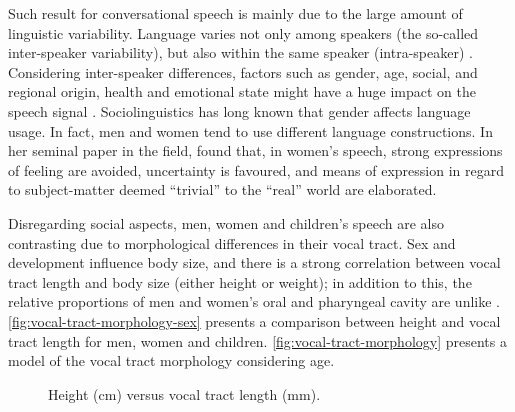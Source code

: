 Such result for conversational speech is mainly due to the large amount of linguistic variability. Language varies not only among speakers (the so-called inter-speaker variability), but also within the same speaker (intra-speaker) \citep{Benzeghiba2007}.  Considering inter-speaker differences, factors such as gender, age, social, and regional 
origin, health and emotional state might have a huge impact on the speech signal \citep{Benzeghiba2007}.
Sociolinguistics has long known that gender affects language usage. In fact, men and women tend to use different language constructions.
In her seminal paper in the field, \citet{Lakoff1973} found that, in women's speech, strong expressions 
of feeling are avoided, uncertainty is favoured, and means of expression in regard to subject-matter deemed ``trivial'' to the 
``real'' world are elaborated. 

Disregarding social aspects, men, women and children's speech are also contrasting due to morphological differences
in their vocal tract. Sex and development influence body size, and there is a strong correlation between vocal tract length and body size 
(either height or weight); in addition to this, the relative proportions of men and women's oral and pharyngeal cavity are unlike 
\cite{Fitch1999}. \autoref{fig:vocal-tract-morphology-sex} presents a comparison between height and
vocal tract length for men, women and children. \autoref{fig:vocal-tract-morphology} presents a model of the vocal tract morphology considering
age.

\begin{figure}[!ht]
        \noindent{}
        \caption{Height (cm) versus vocal tract length (mm).}
        \label{fig:vocal-tract-morphology-sex}
\end{figure}

